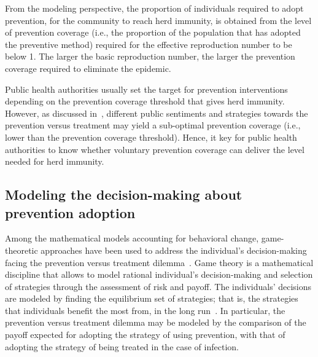 From the modeling perspective, the proportion of individuals required to adopt prevention, for the community to reach herd immunity, is obtained from the level of prevention coverage (i.e., the proportion of the population that has adopted the preventive method) required for the effective reproduction number to be below 1. The larger the basic reproduction number, the larger the prevention coverage required to eliminate the epidemic. 

Public health authorities usually set the target for prevention interventions depending on the prevention coverage threshold that gives herd immunity. However, as discussed in~, different public sentiments and strategies towards the prevention versus treatment may yield a sub-optimal prevention coverage (i.e., lower than the prevention coverage threshold). 
Hence, it key for public health authorities to know whether voluntary prevention coverage can deliver the level needed for herd immunity. 


\subsection{Modeling the decision-making about prevention adoption}
\label{Intro:DecisionModel}

Among the mathematical models accounting for behavioral change, game-theoretic approaches have been used to address the individual's decision-making facing the prevention versus treatment dilemma~\cite[]{Bauch2013,Verelst2016,Wang2016,Chang2020}. Game theory is a mathematical discipline that allows to model rational individual's decision-making and selection of strategies through the assessment of risk and payoff. The individuals' decisions are modeled by finding the equilibrium set of strategies; that is, the strategies that individuals benefit the most from, in the long run~\cite[]{Manfredi2013}. In particular, the prevention versus treatment dilemma may be modeled by the comparison of the payoff expected for adopting the strategy of using prevention, with that of adopting the strategy of being treated in the case of infection.



